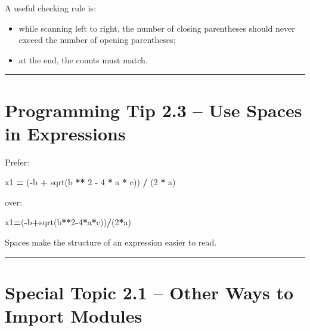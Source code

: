 \documentclass[
]{article}
\newenvironment{Shaded}{\begin{snugshade}}{\end{snugshade}}
\newcommand{\DecValTok}[1]{\textcolor[rgb]{0.00,0.00,0.81}{#1}}
\newcommand{\NormalTok}[1]{#1}
\newcommand{\OperatorTok}[1]{\textcolor[rgb]{0.81,0.36,0.00}{\textbf{#1}}}
\providecommand{\tightlist}{%
  \setlength{\itemsep}{0pt}\setlength{\parskip}{0pt}}
\begin{document}
A useful checking rule is:

\begin{itemize}
\tightlist
\item
  while scanning left to right, the number of closing parentheses should
  never exceed the number of opening parentheses;
\item
  at the end, the counts must match.
\end{itemize}

\begin{center}\rule{0.5\linewidth}{0.5pt}\end{center}

\section{Programming Tip 2.3 -- Use Spaces in
Expressions}\label{programming-tip-2.3-use-spaces-in-expressions}

Prefer:

\begin{Shaded}
\begin{Highlighting}[]
\NormalTok{x1 }\OperatorTok{=}\NormalTok{ (}\OperatorTok{{-}}\NormalTok{b }\OperatorTok{+}\NormalTok{ sqrt(b }\OperatorTok{**} \DecValTok{2} \OperatorTok{{-}} \DecValTok{4} \OperatorTok{*}\NormalTok{ a }\OperatorTok{*}\NormalTok{ c)) }\OperatorTok{/}\NormalTok{ (}\DecValTok{2} \OperatorTok{*}\NormalTok{ a)}
\end{Highlighting}
\end{Shaded}

over:

\begin{Shaded}
\begin{Highlighting}[]
\NormalTok{x1}\OperatorTok{=}\NormalTok{(}\OperatorTok{{-}}\NormalTok{b}\OperatorTok{+}\NormalTok{sqrt(b}\OperatorTok{**}\DecValTok{2}\OperatorTok{{-}}\DecValTok{4}\OperatorTok{*}\NormalTok{a}\OperatorTok{*}\NormalTok{c))}\OperatorTok{/}\NormalTok{(}\DecValTok{2}\OperatorTok{*}\NormalTok{a)}
\end{Highlighting}
\end{Shaded}

Spaces make the structure of an expression easier to read.

\begin{center}\rule{0.5\linewidth}{0.5pt}\end{center}

\section{Special Topic 2.1 -- Other Ways to Import
Modules}\label{special-topic-2.1-other-ways-to-import-modules}
\end{document}
